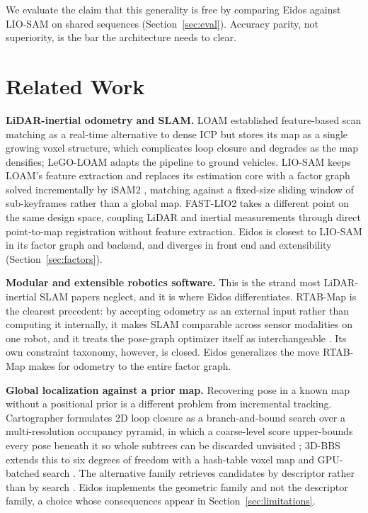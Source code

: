 \documentclass[conference]{IEEEtran}
\begin{document}
We evaluate the claim that this generality is free by comparing Eidos against LIO-SAM on shared sequences (Section~\ref{sec:eval}). Accuracy parity, not superiority, is the bar the architecture needs to clear.

\section{Related Work}

\textbf{LiDAR-inertial odometry and SLAM.} LOAM \parencite{zhang2017loam} established feature-based scan matching as a real-time alternative to dense ICP but stores its map as a single growing voxel structure, which complicates loop closure and degrades as the map densifies; LeGO-LOAM \parencite{shan2018lego} adapts the pipeline to ground vehicles. LIO-SAM \parencite{shan2020liosam} keeps LOAM's feature extraction and replaces its estimation core with a factor graph solved incrementally by iSAM2 \parencite{kaess2012isam2}, matching against a fixed-size sliding window of sub-keyframes rather than a global map. FAST-LIO2 \parencite{xu2022fastlio2} takes a different point on the same design space, coupling LiDAR and inertial measurements through direct point-to-map registration without feature extraction. Eidos is closest to LIO-SAM in its factor graph and backend, and diverges in front end and extensibility (Section~\ref{sec:factors}).

\textbf{Modular and extensible robotics software.} This is the strand most LiDAR-inertial SLAM papers neglect, and it is where Eidos differentiates. RTAB-Map is the clearest precedent: by accepting odometry as an external input rather than computing it internally, it makes SLAM comparable across sensor modalities on one robot, and it treats the pose-graph optimizer itself as interchangeable \parencite{labbe2019rtabmap}. Its own constraint taxonomy, however, is closed. Eidos generalizes the move RTAB-Map makes for odometry to the entire factor graph.

\textbf{Global localization against a prior map.} Recovering pose in a known map without a positional prior is a different problem from incremental tracking. Cartographer formulates 2{D} loop closure as a branch-and-bound search over a multi-resolution occupancy pyramid, in which a coarse-level score upper-bounds every pose beneath it so whole subtrees can be discarded unvisited \parencite{hess2016cartographer}; 3{D}-BBS extends this to six degrees of freedom with a hash-table voxel map and GPU-batched search \parencite{aoki2024bbs}. The alternative family retrieves candidates by descriptor rather than by search \parencite{kim2018scan,labbe2013appearance}. Eidos implements the geometric family and not the descriptor family, a choice whose consequences appear in Section~\ref{sec:limitations}.
\end{document}
